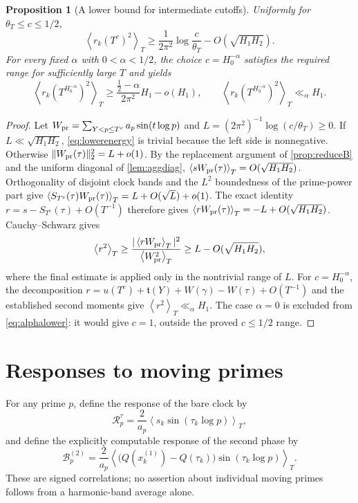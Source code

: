 \documentclass[11pt,reqno]{amsart}
\numberwithin{equation}{section}
\newtheorem{proposition}[theorem]{Proposition}
\newcommand{\av}[1]{\left\langle #1\right\rangle_T}
\begin{document}
\begin{proposition}[A lower bound for intermediate cutoffs]
\label{prop:intermediate}
Uniformly for $\theta_T\le c\le1/2$,
\begin{equation}\label{eq:lowerenergy}
\av{r_k(T^c)^2}
\ge\frac1{2\pi^2}\log\frac c{\theta_T}
 -O(\sqrt{H_1H_2}).
\end{equation}
For every fixed $\alpha$ with $0<\alpha<1/2$, the choice
$c=H_0^{-\alpha}$ satisfies the required range for sufficiently
large $T$ and yields
\begin{equation}\label{eq:alphalower}
\av{r_k(T^{H_0^{-\alpha}})^2}
\ge\frac{\frac12-\alpha}{2\pi^2}H_1-o(H_1),
\qquad\av{r_k(T^{H_0^{-\alpha}})^2}\ll_\alpha H_1.
\end{equation}
\end{proposition}
\begin{proof}
Let $W_{\rm pr}=\sum_{Y<p\le T^c}a_p\sin(t\log p)$
and $L=(2\pi^2)^{-1}\log(c/\theta_T)\ge0$.
If $L\ll\sqrt{H_1H_2}$, \eqref{eq:lowerenergy} is trivial
because the left side is nonnegative.  Otherwise
$\|W_{\rm pr}(\tau)\|_2^2=L+o(1)$.
By the replacement argument of \cref{prop:reduceB} and the
uniform diagonal of \cref{lem:aggdiag},
$\av{sW_{\rm pr}(\tau)}=O(\sqrt{H_1H_2})$.
Orthogonality of disjoint clock bands and the $L^2$ boundedness
of the prime-power part give
$\av{S_{T^c}(\tau)W_{\rm pr}(\tau)}
 =L+O(\sqrt L)+o(1)$.
The exact identity $r=s-S_{T^c}(\tau)+O(T^{-1})$ therefore gives
$\av{rW_{\rm pr}(\tau)}=-L+O(\sqrt{H_1H_2})$.
Cauchy--Schwarz gives
\[
\av{r^2}\ge
\frac{|\av{rW_{\rm pr}}|^2}{\av{W_{\rm pr}^2}}
\ge L-O(\sqrt{H_1H_2}),
\]
where the final estimate is applied only in the nontrivial range
of $L$.  For $c=H_0^{-\alpha}$, the decomposition
$r=u(T^c)+\mathfrak t(Y)+W(\gamma)-W(\tau)+O(T^{-1})$
and the established second moments give $\av{r^2}\ll_\alpha H_1$.
The case $\alpha=0$ is excluded from \eqref{eq:alphalower}:
it would give $c=1$, outside the proved $c\le1/2$ range.
\end{proof}


\section{Responses to moving primes}\label{sec:responses}
For any prime $p$, define the response of the bare clock by
\begin{equation}\label{eq:Rresponse}
\mathcal R_p^\tau
=\frac2{a_p}\av{s_k\sin(\tau_k\log p)},
\end{equation}
and define the explicitly computable response of the second
phase by
\begin{equation}\label{eq:Bresponse}
\mathcal B_p^{(2)}
=\frac2{a_p}\av{\bigl(Q(x_k^{(1)})-Q(\tau_k)\bigr)
\sin(\tau_k\log p)}.
\end{equation}
These are signed correlations; no assertion about individual
moving primes follows from a harmonic-band average alone.
\end{document}
